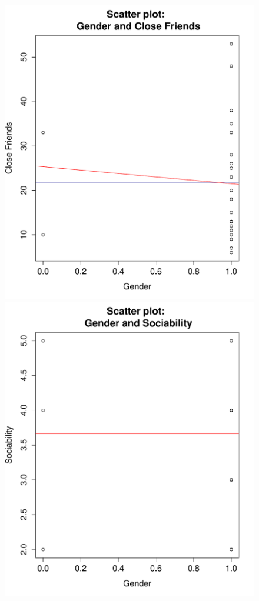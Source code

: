 \begin{figure}[H]
\includegraphics[scale=0.44]{./img/scatplot_closefriends.pdf}
\includegraphics[scale=0.44]{./img/scatplot_sociability.pdf}

\end{figure}
